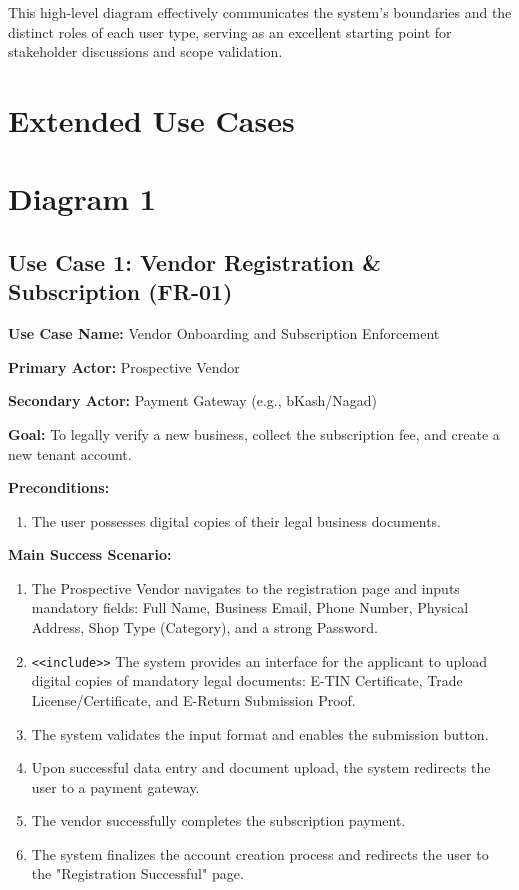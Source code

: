 This high-level diagram effectively communicates the system's boundaries and the distinct roles of each user type, serving as an excellent starting point for stakeholder discussions and scope validation.

\section*{Extended Use Cases}

\section{Diagram 1}

\subsection*{Use Case 1: Vendor Registration \& Subscription (FR-01)}

\textbf{Use Case Name:} Vendor Onboarding and Subscription Enforcement

\textbf{Primary Actor:} Prospective Vendor

\textbf{Secondary Actor:} Payment Gateway (e.g., bKash/Nagad)

\textbf{Goal:} To legally verify a new business, collect the subscription fee, and create a new tenant account.

\textbf{Preconditions:}
\begin{enumerate}
    \item The user possesses digital copies of their legal business documents.
\end{enumerate}

\textbf{Main Success Scenario:}
\begin{enumerate}
    \item The Prospective Vendor navigates to the registration page and inputs mandatory fields: Full Name, Business Email, Phone Number, Physical Address, Shop Type (Category), and a strong Password.
    
    \item \texttt{\textless\textless include\textgreater\textgreater} The system provides an interface for the applicant to upload digital copies of mandatory legal documents: E-TIN Certificate, Trade License/Certificate, and E-Return Submission Proof.
    
    \item The system validates the input format and enables the submission button.
    
    \item Upon successful data entry and document upload, the system redirects the user to a payment gateway.
    
    \item The vendor successfully completes the subscription payment.
    
    \item The system finalizes the account creation process and redirects the user to the "Registration Successful" page.
\end{enumerate}

